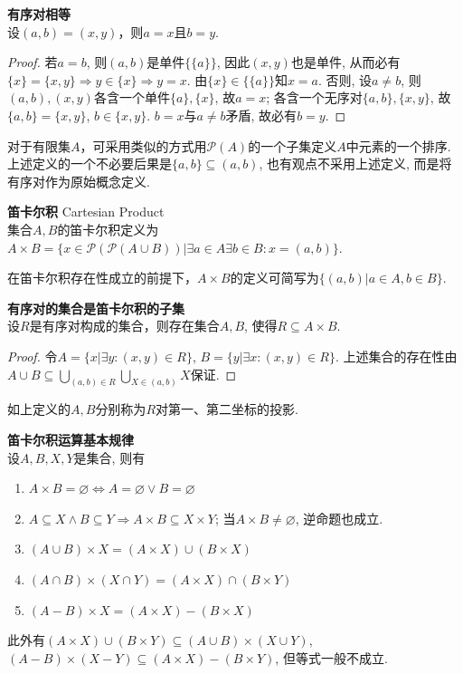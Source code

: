\begin{pro}\textbf{有序对相等}\\
设$(a,b)=(x,y)$，则$a=x$且$b=y$.
\end{pro}
\begin{proof}
    若$a=b$, 则$(a,b)$是单件$\{\{a\}\}$, 因此$(x,y)$也是单件, 从而必有$\{x\}=\{x,y\}\Rightarrow y\in \{x\}\Rightarrow y=x$. 由$\{x\}\in \{\{a\}\}$知$x=a$. 否则, 设$a\neq b$, 则$(a,b),(x,y)$各含一个单件$\{a\},\{x\}$, 故$a=x$; 各含一个无序对$\{a,b\},\{x,y\}$, 故$\{a,b\}=\{x,y\}$, $b\in \{x,y\}$. $b=x$与$a\neq b$矛盾, 故必有$b=y$. 
\end{proof}

\par 对于有限集$A$，可采用类似的方式用$\mathcal{P}(A)$的一个子集定义$A$中元素的一个排序. 上述定义的一个不必要后果是$\{a,b\}\subseteq (a,b)$, 也有观点不采用上述定义, 而是将有序对作为原始概念定义. 

\begin{dfn} \textbf{笛卡尔积} Cartesian Product \\
集合$A,B$的笛卡尔积定义为$A\times B=\{x\in  \mathcal{P}(\mathcal{P}(A\cup B))\vert \exists a\in A\exists b\in B: x=(a,b)\}$. 
\end{dfn}
在笛卡尔积存在性成立的前提下，$A\times B$的定义可简写为$\{(a,b)\vert a\in A, b\in B\}$. 

\begin{pro}\textbf{有序对的集合是笛卡尔积的子集}\\
设$R$是有序对构成的集合，则存在集合$A,B$, 使得$R \subseteq A\times B$.
\end{pro}
\begin{proof}
令$A=\{x \vert \exists y: (x,y)\in R\}$, $B=\{y \vert \exists x: (x,y)\in R\}$. 上述集合的存在性由$A\cup B\subseteq \bigcup_{(a,b)\in R} \bigcup_{X\in (a,b)} X$保证. 
\end{proof}
如上定义的$A,B$分别称为$R$对第一、第二坐标的投影.

\begin{pro}\textbf{笛卡尔积运算基本规律}\\
设$A,B,X,Y$是集合, 则有
\begin{enumerate}
\item $A\times B=\varnothing \Leftrightarrow A=\varnothing \lor B=\varnothing$
\item $A\subseteq X \land B\subseteq Y\Rightarrow A\times B \subseteq X\times Y$; 当$A\times B\neq \varnothing$, 逆命题也成立. 
\item $(A\cup B)\times X=(A\times X) \cup (B \times X)$
\item $(A\cap B)\times (X \cap Y)=(A\times X) \cap (B\times Y)$
\item $(A-B)\times X=(A\times X)-(B\times X)$
\end{enumerate}
\end{pro}
此外有$(A\times X)\cup (B\times Y)\subseteq (A\cup B)\times (X\cup Y)$, $(A-B)\times (X-Y)\subseteq (A\times X)- (B\times Y)$, 但等式一般不成立. 

